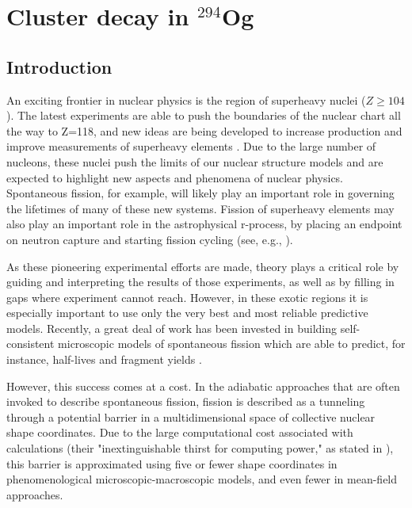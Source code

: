 \chapter{Cluster decay in $^{294}$Og}\label{chap:294Og}

\section{\label{sec:introduction}Introduction}

An exciting frontier in nuclear physics is the region of superheavy nuclei ($Z\geq104$). The latest experiments are able to push the boundaries of the nuclear chart all the way to Z=118, and new ideas are being developed to increase production and improve measurements of superheavy elements \cite{Dmitriev2016,Oganessian2016}. Due to the large number of nucleons, these nuclei push the limits of our nuclear structure models and are expected to highlight new aspects and phenomena of nuclear physics. Spontaneous fission, for example, will likely play an important role in governing the lifetimes of many of these new systems. Fission of superheavy elements may also play an important role in the astrophysical r-process, by placing an endpoint on neutron capture and starting fission cycling (see, e.g., \cite{Giuliani2017}).

As these pioneering experimental efforts are made, theory plays a critical role by guiding and interpreting the results of those experiments, as well as by filling in gaps where experiment cannot reach. However, in these exotic regions it is especially important to use only the very best and most reliable predictive models. Recently, a great deal of work has been invested in building self-consistent microscopic models of spontaneous fission which are able to predict, for instance, half-lives and fragment yields \cite{Sadhukhan2013,Sadhukhan2014,Sadhukhan2016,Sadhukhan2017}.

However, this success comes at a cost. In the adiabatic approaches that are often invoked to describe spontaneous fission, fission is described as a tunneling through a potential barrier in a multidimensional space of collective nuclear shape coordinates. Due to the large computational cost associated with calculations (their "inextinguishable thirst for computing power," as stated in \cite{Schunck2016}), this barrier is approximated using five or fewer shape coordinates in phenomenological microscopic-macroscopic models, and even fewer in mean-field approaches.

